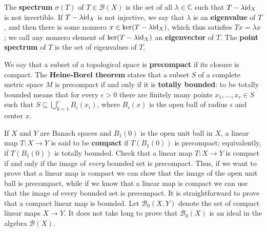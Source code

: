 \documentclass{article}
\newcommand{\id}{\ensuremath\mathrm{id}}
\theoremstyle{definition}
\begin{document}
The \textbf{spectrum} $\sigma(T)$ of $T\in \mathscr{B}(X)$ is the set of all $\lambda \in \mathbb{C}$ such that $T-\lambda \id_X$ is not invertible.
If $T-\lambda \id_X$ is not injective, we say that $\lambda$ is an \textbf{eigenvalue} of $T$, and then there is some
nonzero $x \in \ker(T-\lambda \id_X)$, which thus satisfies  $Tx=\lambda x$; we call any nonzero element of $\ker(T-\lambda \id_X)$ an \textbf{eigenvector}
of $T$. The \textbf{point spectrum} of $T$ is the set of eigenvalues of $T$.

We say that a subset of a topological space is \textbf{precompact}  if its closure is compact. The \textbf{Heine-Borel theorem} states that a subset $S$ of a complete
metric space $M$ is precompact if and only if it is \textbf{totally bounded}: to be totally bounded 
means that for every $\epsilon>0$ there are finitely many points $x_1,\ldots,x_r \in S$ such that $S \subseteq \bigcup_{k=1}^r B_\epsilon(x_i)$,
where $B_\epsilon(x)$ is the open ball of radius $\epsilon$ and center $x$.

If $X$ and $Y$ are Banach spaces and $B_1(0)$ is the open unit ball in $X$, a linear map $T:X \to Y$ is said to be \textbf{compact}
if $T(B_1(0))$ is precompact; equivalently, if $T(B_1(0))$ is totally bounded. Check that
a linear map $T:X \to Y$ is compact if and only if the image of {\em every} bounded set is precompact. Thus, if we want to prove that a linear map is compact we can
show that the image of the open unit ball is precompact, while if we know that a linear map is compact we can use that the image of every bounded set is precompact.
It is straightforward to prove that a compact linear map is bounded. Let $\mathscr{B}_0(X,Y)$ denote the set of compact linear maps
$X \to Y$. It does not take long to prove that $\mathscr{B}_0(X)$ is an ideal in the algebra $\mathscr{B}(X)$.
\end{document}
